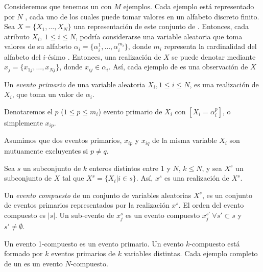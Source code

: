 Consideremos que tenemos un \dataset \D con $M$ ejemplos. Cada ejemplo está representado por $N$ \atributos, cada uno de los cuales puede tomar valores en un alfabeto discreto finito. Sea $X = \{X_1,\ldots,X_N\}$ una representación de este conjunto de \atributos. Entonces, cada atributo $X_i,\ 1\leq i\leq N$, podría considerarse una variable aleatoria que toma valores de su alfabeto $\alpha_i = \{\alpha_i^1,\ldots,\alpha_i^{m_i}\}$, donde $m_i$ representa la cardinalidad del alfabeto del $i$-ésimo \atributo. Entonces, una realización de $X$ se puede denotar mediante $x_j = \{x_{1j},\ldots,x_{Nj}\}$, donde $x_{ij} \in \alpha_i$. Así, cada ejemplo de \D es una observación de $X$

\begin{defn}
   Un \emph{evento primario} de una variable aleatoria $X_i, 1\leq i\leq N$, es una realización de $X_i$, que toma un valor de $\alpha_i$.
\label{def:evento-primario}
\end{defn}

Denotaremos el $p$ ($1\leq p\leq m_i$) evento primario de $X_i$ con $[X_i = \alpha_i^p]$, o simplemente $x_{ip}$. 

\begin{prop}[Unicidad]
   Asumimos que dos eventos primarios, $x_{ip}$ y $x_{iq}$ de la misma variable $X_i$ son mutuamente excluyentes si $p\neq q$.
\label{prop:unicidad}
\end{prop}

Sea $s$ un subconjunto de $k$ enteros distintos entre 1 y $N$, $k\leq N$, y sea $X^s$ un subconjunto de $X$ tal que $X^s = \{X_i | i\in s\}$. Así, $x^s$ es una realización de $X^s$.

\begin{defn}
   Un \emph{evento compuesto} de un conjunto de variables aleatorias $X^s$, es un conjunto de eventos primarios representados por la realización $x^s$. El orden del evento compuesto es $|s|$. Un sub-evento de $x_j^s$ es un evento compuesto $x_j^{s'}\ \forall s'\subset s$ y $s'\neq\emptyset$.
\label{def:evento-compuesto}
\end{defn}

Un evento 1-compuesto es un evento primario. Un evento $k$-compuesto está formado por $k$ eventos primarios de $k$ variables distintas. Cada ejemplo completo de un \dataset es un evento $N$-compuesto.

